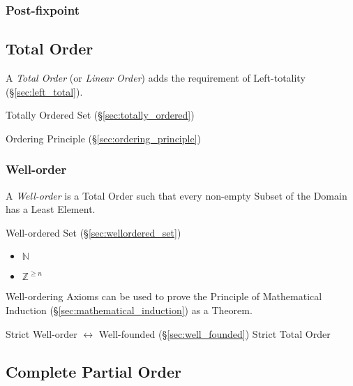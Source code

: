 \subsubsection{Post-fixpoint}\label{sec:postfixpoint}



\subsection{Total Order}\label{sec:total_order}

A \emph{Total Order} (or \emph{Linear Order}) adds the requirement of
Left-totality (\S\ref{sec:left_total}).

Totally Ordered Set (\S\ref{sec:totally_ordered})

Ordering Principle (\S\ref{sec:ordering_principle})



\subsubsection{Well-order}\label{sec:well_order}

A \emph{Well-order} is a Total Order such that every non-empty Subset
of the Domain has a Least Element.

Well-ordered Set (\S\ref{sec:wellordered_set})

\begin{itemize}
  \item $\mathbb{N}$
  \item $\mathbb{Z}^{\geq n}$
\end{itemize}

Well-ordering Axioms can be used to prove the Principle of
Mathematical Induction (\S\ref{sec:mathematical_induction}) as a
Theorem.

Strict Well-order $\leftrightarrow$ Well-founded
(\S\ref{sec:well_founded}) Strict Total Order



\subsection{Complete Partial Order}\label{sec:complete_partialorder}

